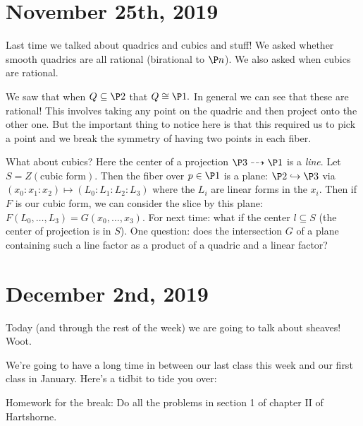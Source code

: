 \documentclass[12pt]{article}
\begin{document}
\section{November 25th, 2019}
Last time we talked about quadrics and cubics and stuff! We asked whether smooth quadrics are all rational (birational to $\P n$). We also asked when cubics are rational.

We saw that when $Q\subseteq \P2$ that $Q\cong \P1.$ In general we can see that these are rational! This involves taking any point on the quadric 
and then project onto the other one. But the important thing to notice here is that this required us to pick a point and we break the symmetry of having 
two points in each fiber.

What about cubics? Here the center of a projection $\P3\dashrightarrow\P1$ is a \textit{line}. Let $S=Z(\text{cubic form})$. Then the fiber over $p\in\P1$ is 
a plane: $\P2\hookrightarrow\P3$ via $(x_0:x_1:x_2)\mapsto(L_0:L_1:L_2:L_3)$ where the $L_i$ are linear forms in the $x_i$. Then if $F$ is our cubic form,
we can consider the slice by this plane: $F(L_0,\dots,L_3)=G(x_0,\dots,x_3)$. For next time: what if the center $l\subseteq S$ (the center of projection is in $S$). One question:
does the intersection $G$ of a plane containing such a line factor as a product of a quadric and a linear factor?

\section{December 2nd, 2019}
Today (and through the rest of the week) we are going to talk about sheaves! Woot.

We're going to have a long time in between our last class this week and our first class in January. Here's a tidbit to tide you over:
\begin{prob}
	Homework for the break: Do all the problems in section 1 of chapter II of Hartshorne.
\end{prob}
\end{document}
